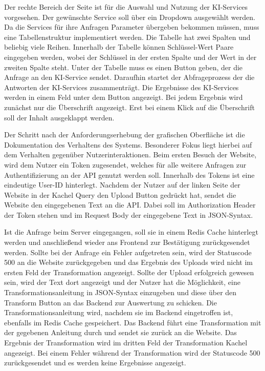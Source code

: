 Der rechte Bereich der Seite ist für die Auswahl und Nutzung der KI-Services vorgesehen. Der gewünschte Service soll über ein Dropdown ausgewählt werden. Da die Services für ihre Anfragen Parameter übergeben bekommen müssen, muss eine Tabellenstruktur implementiert werden. Die Tabelle hat zwei Spalten und beliebig viele Reihen. Innerhalb der Tabelle können Schlüssel-Wert Paare eingegeben werden, wobei der Schlüssel in der ersten Spalte und der Wert in der zweiten Spalte steht. Unter der Tabelle muss es einen Button geben, der die Anfrage an den KI-Service sendet. Daraufhin startet der Abfrageprozess der die Antworten der KI-Services zusammenträgt. Die Ergebnisse des KI-Services werden in einem Feld unter dem Button angezeigt. Bei jedem Ergebnis wird zunächst nur die Überschrift angezeigt. Erst bei einem Klick auf die Überschrift soll der Inhalt ausgeklappt werden.

Der Schritt nach der Anforderungserhebung der grafischen Oberfläche ist die Dokumentation des Verhaltens des Systems. Besonderer Fokus liegt hierbei auf dem Verhalten gegenüber Nutzerinteraktionen. Beim ersten Besuch der Website, wird dem Nutzer ein Token zugesendet, welches für alle weitere Anfragen zur Authentifizierung an der API genutzt werden soll. Innerhalb des Tokens ist eine eindeutige User-ID hinterlegt. Nachdem der Nutzer auf der linken Seite der Website in der Kachel \glqq Query\grqq{} den Upload Button gedrückt hat, sendet die Website den eingegebenen Text an die API. Dabei soll im Authorization Header der Token stehen und im Request Body der eingegebene Text in JSON-Syntax. 

Ist die Anfrage beim Server eingegangen, soll sie in einem Redis Cache hinterlegt werden und anschließend wieder ans Frontend zur Bestätigung zurückgesendet werden. Sollte bei der Anfrage ein Fehler aufgetreten sein, wird der Statuscode 500 an die Website zurückgegeben und das Ergebnis des Uploads wird nicht im ersten Feld der Transformation angezeigt. Sollte der Upload erfolgreich gewesen sein, wird der Text dort angezeigt und der Nutzer hat die Möglichkeit, eine Transformationsanleitung in JSON-Syntax einzugeben und diese über den \glqq Transform\grqq{} Button an das Backend zur Auswertung zu schicken. Die Transformationsanleitung wird, nachdem sie im Backend eingetroffen ist, ebenfalls im Redis Cache gespeichert. Das Backend führt eine Transformation mit der gegebenen Anleitung durch und sendet sie zurück an die Website. Das Ergebnis der Transformation wird im dritten Feld der \glqq Transformation\grqq{} Kachel angezeigt. Bei einem Fehler während der Transformation wird der Statuscode 500 zurückgesendet und es werden keine Ergebnisse angezeigt.

